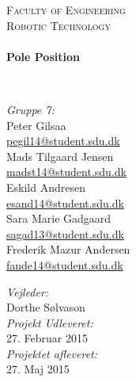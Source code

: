 \begin{titlepage}
\begin{center}




\textsc{\huge \color{sdu_grey} Faculty of Engineering}\\[0.5cm]

\textsc{\LARGE \color{sdu_grey} Robotic Technology}\\[0.5cm]

\HRule \\[1ex]
{ \Huge \bfseries Pole Position \\[1ex] }

\HRule \\[1.5cm]

\begin{minipage}{0.50\textwidth}
\begin{flushleft}\large
\emph{Gruppe 7:}\\
Peter Gilsaa \\
\href{mailto:pegil14@student.sdu.dk}{\color{sdu_blue}pegil14@student.sdu.dk}\\
Mads Tilgaard Jensen\\
\href{mailto:madst14@student.sdu.dk}{\color{sdu_blue}madst14@student.sdu.dk}\\
Eskild Andresen\\
\href{mailto:esand14@student.sdu.dk}{\color{sdu_blue}esand14@student.sdu.dk}\\
Sara Marie Gadgaard\\
\href{mailto:sagad13@student.sdu.dk}{\color{sdu_blue}sagad13@student.sdu.dk}\\
Frederik Mazur Andersen\\
\href{mailto:fande14@student.sdu.dk}{\color{sdu_blue}fande14@student.sdu.dk}\\
\end{flushleft}
\end{minipage}
\begin{minipage}[c][2cm]{0.45\textwidth}
\begin{flushright} \large
\vspace{2cm}
\emph{Vejleder:} \\
Dorthe Sølvason  \\
\vspace{2cm}
\emph{Projekt Udleveret:} \\
27. Februar 2015 \\
\emph{Projektet afleveret:} \\
27. Maj 2015
\end{flushright}
\end{minipage}


\end{center}
\end{titlepage}
